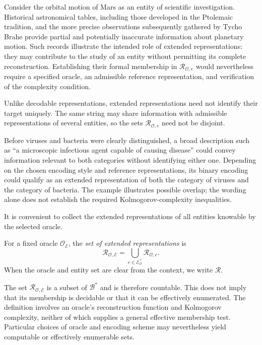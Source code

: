 \begin{example}
Consider the orbital motion of Mars as an entity of scientific investigation. Historical astronomical tables, including those developed in the Ptolemaic tradition, and the more precise observations subsequently gathered by Tycho Brahe provide partial and potentially inaccurate information about planetary motion. Such records illustrate the intended role of extended representations: they may contribute to the study of an entity without permitting its complete reconstruction. Establishing their formal membership in $\mathcal R_{\mathcal O,e}$ would nevertheless require a specified oracle, an admissible reference representation, and verification of the complexity condition.
\end{example}

Unlike decodable representations, extended representations need not identify their target uniquely. The same string may share information with admissible representations of several entities, so the sets $\mathcal R_{\mathcal O,e}$ need not be disjoint.

\begin{example}
\label{ex:infectious_agents}
Before viruses and bacteria were clearly distinguished, a broad description such as ``a microscopic infectious agent capable of causing disease'' could convey information relevant to both categories without identifying either one. Depending on the chosen encoding style and reference representations, its binary encoding could qualify as an extended representation of both the category of viruses and the category of bacteria. The example illustrates possible overlap; the wording alone does not establish the required Kolmogorov-complexity inequalities.
\end{example}

It is convenient to collect the extended representations of all entities knowable by the selected oracle.

\begin{definition}
\label{def:set_extended_representations}
For a fixed oracle $\mathcal O_{\mathcal E}$, the \emph{set of extended representations} is
\[
\mathcal R_{\mathcal O,\mathcal E} = \bigcup_{e\in\mathcal E^\top_{\mathcal O}} \mathcal R_{\mathcal O,e}.
\]
When the oracle and entity set are clear from the context, we write $\mathcal R$.
\end{definition}

The set $\mathcal R_{\mathcal O,\mathcal E}$ is a subset of $\mathcal B^\ast$ and is therefore countable. This does not imply that its membership is decidable or that it can be effectively enumerated. The definition involves an oracle's reconstruction function and Kolmogorov complexity, neither of which supplies a general effective membership test. Particular choices of oracle and encoding scheme may nevertheless yield computable or effectively enumerable sets.

